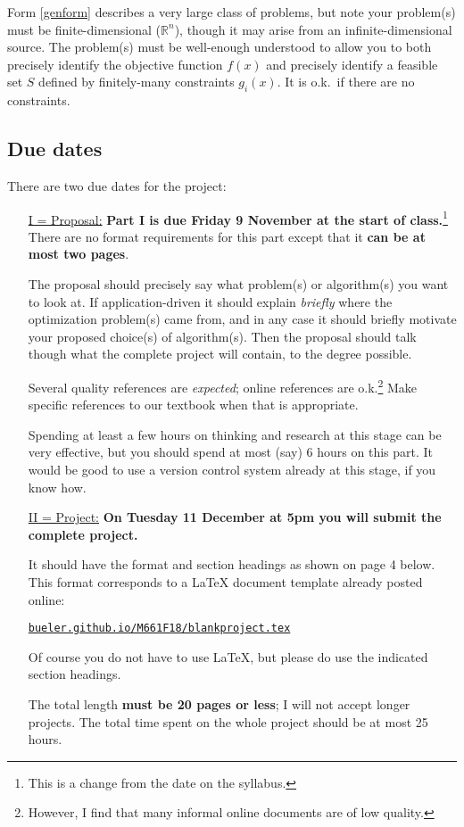 \documentclass[12pt]{amsart}
\newcommand{\RR}{\mathbb{R}}
\begin{document}
Form \eqref{genform} describes a very large class of problems, but note your problem(s) must be finite-dimensional ($\RR^n$), though it may arise from an infinite-dimensional source.  The problem(s) must be well-enough understood to allow you to both precisely identify the objective function $f(x)$ and precisely identify a feasible set $S$ defined by finitely-many constraints $g_i(x)$.  It is o.k.~if there are no constraints.  


\subsection*{Due dates}  There are two due dates for the project:

\medskip
\begin{itemize}
\item[\underline{I = Proposal:}]  \textbf{Part I is due Friday 9 November at the start of class.}\footnote{This is a change from the date on the syllabus.}  There are no format requirements for this part except that it \textbf{can be at most two pages}.

The proposal should precisely say what problem(s) or algorithm(s) you want to look at.  If application-driven it should explain \emph{briefly} where the optimization problem(s) came from, and in any case it should briefly motivate your proposed choice(s) of algorithm(s).  Then the proposal should talk though what the complete project will contain, to the degree possible.

Several quality references are \emph{expected}; online references are o.k.\footnote{However, I find that many informal online documents are of low quality.}  Make specific references to our textbook when that is appropriate.

Spending at least a few hours on thinking and research at this stage can be very effective, but you should spend at most (say) 6 hours on this part.  It would be good to use a version control system already at this stage, if you know how.

\medskip
\item[\underline{II = Project:}]  \textbf{On Tuesday 11 December at 5pm you will submit the complete project.}

It should have the format and section headings as shown on page 4 below.  This format corresponds to a \LaTeX\xspace document template already posted online:

\centerline{\href{http://bueler.github.io/M661F18/index.html}{\texttt{bueler.github.io/M661F18/blankproject.tex}}}

\noindent Of course you do not have to use \LaTeX, but please do use the indicated section headings.

The total length \textbf{must be 20 pages or less}; I will not accept longer projects.  The total time spent on the whole project should be at most 25 hours.
\end{itemize}
\end{document}
